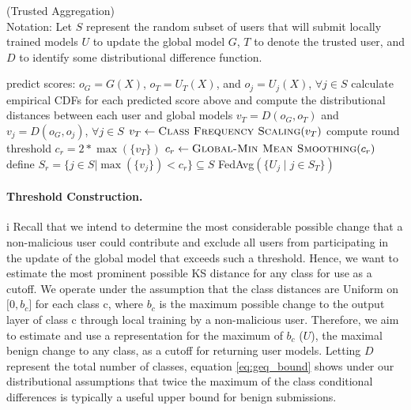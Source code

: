 \documentclass{article} %
\begin{document}
\begin{algorithm}[H]
\caption{ (Trusted Aggregation) \\ 
Notation: Let $S$ represent the random subset of users that will submit locally trained models $U$ to update the global model $G$, $T$ to denote the trusted user, and $D$ to identify some distributional difference function.
}
\label{alg:t-agg}
\begin{algorithmic}[1]

            \State predict scores: $o_G = G(X)$, $o_{T} = U_T(X)$, and $o_j = U_j(X)$, $\forall j \in S$
            \State calculate empirical CDFs for each predicted score above 
            \State \quad and compute the distributional distances between each user and global models 
            \State \quad $v_T = D(o_G, o_T)$ and $v_{j} = D(o_G, o_{j})$, $\forall j \in S$
            \State $v_T \gets \Call{Class Frequency Scaling}{v_T}$  
        \EndFor
        \State compute round threshold $c_r = 2 * \max ( \{v_T\} )$
        \State  $c_r \gets \Call{Global-Min Mean Smoothing}{c_r}$  
        \State define $S_r = \{j \in S | \max (\{v_{j}\}) < c_r \} \subseteq S$
        \State \Return FedAvg$(\{U_j \mid j \in S_T \})$ 
    \EndProcedure
\end{algorithmic}
\end{algorithm}


%
\paragraph{Threshold Construction.} i Recall that we intend to determine the most considerable possible change that a non-malicious user could contribute and exclude all users from participating in the update of the global model that exceeds such a threshold. Hence, we want to estimate the most prominent possible KS distance for any class for use as a cutoff. We operate under the assumption that the class distances are Uniform on $\mathopen[0, b_c\mathclose]$ for each class c, where $b_c$ is the maximum possible change to the output layer of class c through local training by a non-malicious user. Therefore, we aim to estimate and use a representation for the maximum of $b_c$ ($U$), the maximal benign change to any class, as a cutoff for returning user models. Letting $D$ represent the total number of classes, equation \ref{eq:geq_bound} shows under our distributional assumptions that twice the maximum of the class conditional differences is typically a useful upper bound for benign submissions.
\end{document}
